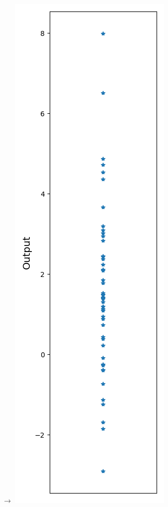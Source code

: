 \documentclass[aspectratio=169]{beamer}
\begin{document}
\begin{frame}[containsverbatim]
\begin{columns}
$\rightarrow$
    \includegraphics[width=.35\textwidth]{figures/Functional_Output.png}
  \end{columns}

\end{frame}

\end{document}
